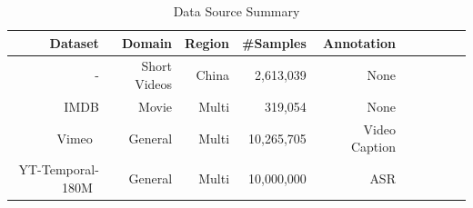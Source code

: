 \begin{table}[t]
\scriptsize
    \centering
    \caption{Data Source Summary}
    \vspace{-0.3cm}
    \begin{tabular}{r r r r r r r r r r} 
    \toprule
    Dataset & Domain  & Region & \#Samples & Annotation  \\\hline\hline
    - & Short Videos & China & 2,613,039 & None \\
    IMDB & Movie & Multi & 319,054 & None \\
    Vimeo~\cite{wang2023lavie} & General & Multi & 10,265,705 & Video Caption \\
    YT-Temporal-180M~\cite{zellers2021merlot} & General & Multi & 10,000,000 & ASR \\
    \bottomrule
    \end{tabular}
    \label{tab:internvid2_datasets_source}
\end{table}